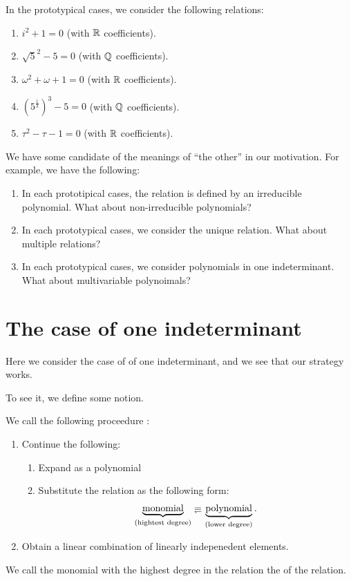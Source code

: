 \begin{remark}
  \label{rem:ourprob}
  In the prototypical cases,
  we consider the following relations:
\begin{enumerate}
\item
  $i^2+1=0$ (with $\mathbb{R}$ coefficients).
\item
  $\sqrt{5}^2-5=0$ (with $\mathbb{Q}$ coefficients).
\item
  $\omega^2+\omega+1=0$ (with $\mathbb{R}$ coefficients).
\item
  $\left(5^{\frac{1}{3}}\right)^3-5=0$  (with $\mathbb{Q}$ coefficients).
\item
  $\tau^2-\tau-1=0$ (with $\mathbb{R}$ coefficients).
\end{enumerate}
We have some candidate of the meanings of ``the other'' in our motivation.
For example, we have the following:
\begin{enumerate}
\item
  \label{ourprob:item:1}
  In each prototipical cases,
  the relation is defined by an irreducible polynomial.
  What about non-irreducible polynomials?

\item
  \label{ourprob:item:2}
  In each prototypical cases,
  we consider the unique relation.
  What about multiple relations?

\item
  \label{ourprob:item:3}
  In each prototypical cases,
  we consider polynomials
  in one indeterminant.
  What about multivariable polynoimals?
\end{enumerate}
\end{remark}


\section{The case of one indeterminant}
Here we consider the case of  of one indeterminant, and
we see that our strategy works.

To see it, we define some notion.
\begin{definition}
  We call the following proceedure
  :
\begin{enumerate}
\item Continue the following:
  \begin{enumerate}
  \item Expand as a polynomial
  \item
    \label{basicstrategy:item:subs}
    Substitute the relation as the following form:
    \begin{align*}
      \underbrace{\text{monomial}}_{\text{(hightest degree)}}\denotes \underbrace{\text{polynomial}}_{\text{(lower degree)}}.
    \end{align*}
  \end{enumerate}
\item Obtain  a linear combination of linearly indepenedent elements.
\end{enumerate}
We call the monomial with the highest degree in the relation
the  of the relation.
\end{definition}

